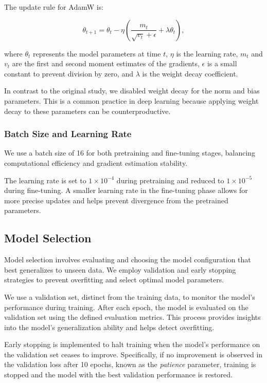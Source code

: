 The update rule for AdamW is:

\[
\theta_{t+1} = \theta_t - \eta \left( \frac{m_t}{\sqrt{v_t} + \epsilon} + \lambda \theta_t \right),
\]

where \(\theta_t\) represents the model parameters at time \(t\), \(\eta\) is the learning rate, \(m_t\) and \(v_t\) are the first and second moment estimates of the gradients, \(\epsilon\) is a small constant to prevent division by zero, and \(\lambda\) is the weight decay coefficient.

In contrast to the original study, we disabled weight decay for the norm and bias parameters. This is a common practice in deep learning because applying weight decay to these parameters can be counterproductive\cite{BagTricksImage2018}.

\subsubsection{Batch Size and Learning Rate}

We use a batch size of \num{16} for both pretraining and fine-tuning stages, balancing computational efficiency and gradient estimation stability.

The learning rate is set to \(1 \times 10^{-4}\) during pretraining and reduced to \(1 \times 10^{-5}\) during fine-tuning. A smaller learning rate in the fine-tuning phase allows for more precise updates and helps prevent divergence from the pretrained parameters.

\subsection{Model Selection}

Model selection involves evaluating and choosing the model configuration that best generalizes to unseen data. We employ validation and early stopping strategies to prevent overfitting and select optimal model parameters.

We use a validation set, distinct from the training data, to monitor the model's performance during training. After each epoch, the model is evaluated on the validation set using the defined evaluation metrics. This process provides insights into the model's generalization ability and helps detect overfitting.

Early stopping is implemented to halt training when the model's performance on the validation set ceases to improve. Specifically, if no improvement is observed in the validation loss after 10 epochs, known as the \emph{patience} parameter, training is stopped and the model with the best validation performance is restored.

